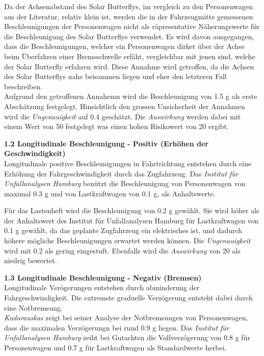 \begin{description}
    Da der Achsenabstand des Solar Butterflys, im vergleich zu den Personenwagen aus der Literatur, relativ klein ist, werden die in der Fahrzeugmitte gemessenen Beschleunigungen der Personenwagen nicht als räpresentative Näherungswerte für die Beschleunigung des Solar Butterflys verwendet. Es wird davon ausgegangen, dass die Beschleunigungen, welcher ein Personenwagen dirket über der Achse beim Überfahren einer Bremsschwelle erfäht, vergleichbar mit jenen sind, welche der Solar Butterfly erfahren wird. Diese Annahme wird getroffen, da die Achsen des Solar Butterflys nahe beisammen liegen und eher den letzteren Fall beschreiben.\\
    Aufgrund den getroffenen Annahemn wird die Beschleunigung von 1.5 g als erste Abschätzung festgelegt. Hinsichtlich den grossen Unsicherheit der Annahmen wird die \emph{Ungenauigkeit} auf 0.4 geschätzt. Die \emph{Auswirkung} werden dabei mit einem Wert von 50 festgelegt was einen hohen Risikowert von 20 ergibt.

    \item \textbf{1.2 Longitudinale Beschleunigung - Positiv (Erhöhen der Geschwindigkeit)}\\
    Longitudinale positive Beschleunigungen in Fahrtrichtung entstehen durch eine Erhöhung der Fahrgeschwindigkeit durch das Zugfahrzeug. Das \emph{Institut für Unfallanalysen Hamburg} \cite{Verz.3} benützt die Beschleunigung von Personenwagen von maximal 0.3 g und von Lastkraftwagen von 0.1 g, als Anhaltswerte.

    Für das Lastenheft wird die Beschleunigung von 0.2 g gewählt. Sie wird höher als der Anhaltswert des Institut für Unfallanalysen Hamburg für Lastkraftwagen von 0.1 g gewählt, da das geplante Zugfahrzeug ein elektrisches ist, und dadurch höhere mögliche Beschleunigungen erwartet werden können. Die \emph{Ungenauigkeit} wird mit 0.2 als gering eingestuft. Ebenfalls wird die \emph{Auswirkung} von 20 als niedrig bewertet.

    \item \textbf{1.3 Longitudinale Beschleunigung - Negativ (Bremsen)}\\
    Longitudinale Verögerungen entstehen durch abminderung der Fahrgeschwindigkeit. Die extremste graduelle Verzögerung entsteht dabei durch eine Notbremsung.\\
    \emph{Kudarauskas} \cite{Verz.1} zeigt bei seiner Analyse der Notbremsungen von Personenwagen, dass die maximalen Verzögerungn bei rund 0.9 g liegen. Das \emph{Institut für Unfallanalysen Hamburg} \cite{Verz.2} zeiht bei Gutachten die Vollverzögerung von 0.8 g für Personenwagen und 0.7 g für Lastkraftwagen als Standardwerte herbei.


\end{description}
